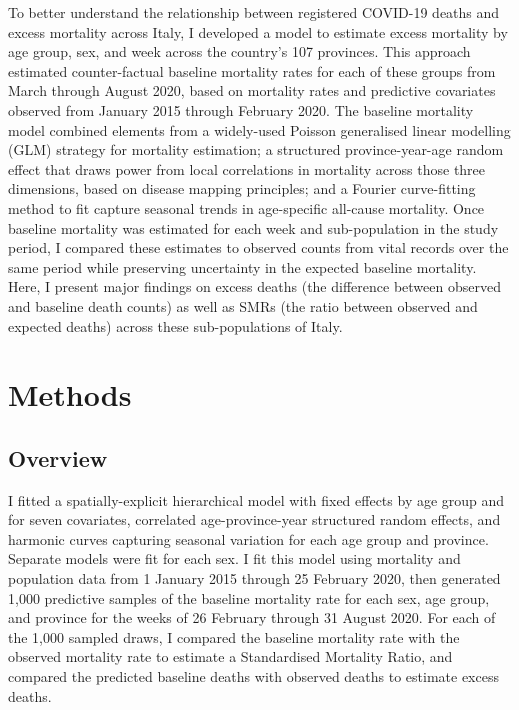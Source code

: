 \documentclass[
]{report}
\begin{document}
To better understand the relationship between registered COVID-19 deaths and excess mortality across Italy, I developed a model to estimate excess mortality by age group, sex, and week across the country's 107 provinces. This approach estimated counter-factual baseline mortality rates for each of these groups from March through August 2020, based on mortality rates and predictive covariates observed from January 2015 through February 2020. The baseline mortality model combined elements from a widely-used Poisson generalised linear modelling (GLM) strategy for mortality estimation\autocite{Noufaily2013}; a structured province-year-age random effect that draws power from local correlations in mortality across those three dimensions, based on disease mapping principles\autocite{Banerjee2014}; and a Fourier curve-fitting method to fit capture seasonal trends in age-specific all-cause mortality\autocite{Serfling1963}. Once baseline mortality was estimated for each week and sub-population in the study period, I compared these estimates to observed counts from vital records over the same period while preserving uncertainty in the expected baseline mortality. Here, I present major findings on excess deaths (the difference between observed and baseline death counts) as well as SMRs (the ratio between observed and expected deaths) across these sub-populations of Italy.

\hypertarget{methods-3}{%
\section{Methods}\label{methods-3}}

\hypertarget{overview}{%
\subsection{Overview}\label{overview}}

I fitted a spatially-explicit hierarchical model with fixed effects by age group and for seven covariates, correlated age-province-year structured random effects, and harmonic curves capturing seasonal variation for each age group and province. Separate models were fit for each sex. I fit this model using mortality and population data from 1 January 2015 through 25 February 2020, then generated 1,000 predictive samples of the baseline mortality rate for each sex, age group, and province for the weeks of 26 February through 31 August 2020. For each of the 1,000 sampled draws, I compared the baseline mortality rate with the observed mortality rate to estimate a Standardised Mortality Ratio, and compared the predicted baseline deaths with observed deaths to estimate excess deaths.
\end{document}
